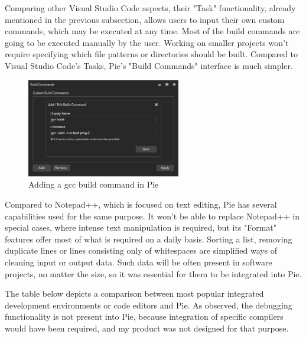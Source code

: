 Comparing other Visual Studio Code aspects, their "Task" functionality, already mentioned in the previous subsection, allows users to input their own custom commands, which may be executed at any time. Most of the build commands are going to be executed manually by the user. Working on smaller projects won't require specifying which file patterns or directories should be built. Compared to Visual Studio Code's Tasks, Pie's "Build Commands" interface is much simpler.

\begin{figure}[H]
\centering
\includegraphics[width=0.6\textwidth]{images/pie-build-commands.png}
\caption{Adding a gcc build command in Pie}
\label{fig:fig2,1.}
\end{figure}

Compared to Notepad++, which is focused on text editing, Pie has several capabilities used for the same purpose. It won't be able to replace Notepad++ in special cases, where intense text manipulation is required, but its "Format" features offer most of what is required on a daily basis. Sorting a list, removing duplicate lines or lines consisting only of whitespaces are simplified ways of cleaning input or output data. Such data will be often present in software projects, no matter the size, so it was essential for them to be integrated into Pie.

The table below depicts a comparison between most popular integrated development environments or code editors and Pie. As observed, the debugging functionality is not present into Pie, because integration of specific compilers would have been required, and my product was not designed for that purpose.

